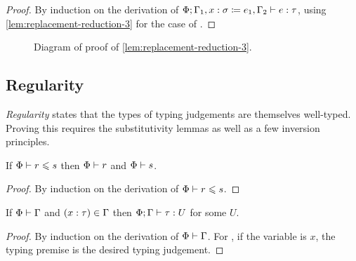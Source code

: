 \begin{proof}
By induction on the derivation of
$\Phi; \Gamma_1, x \mathrel{:} \sigma \mathrel{\coloneqq} e_1, \Gamma_2 \mathrel{\vdash} e \mathrel{:} \tau$,
using \cref{lem:replacement-reduction-3}
for the case of .
\end{proof}

\begin{figure}[h]
\centering
{}
\caption{Diagram of proof of \cref{lem:replacement-reduction-3}.}
\label{fig:replacement-reduction-3}
\end{figure}

\subsection{Regularity}

\emph{Regularity}
states that the types of typing judgements are themselves well-typed.
Proving this requires the substitutivity lemmas as well as a few inversion principles.

\begin{lemma} \label{lem:wf-subsize}
If $\Phi \mathrel{\vdash} r \mathrel{\leqslant} s$ then $\Phi \mathrel{\vdash} r$ and $\Phi \mathrel{\vdash} s$.
\end{lemma}

\begin{proof}
By induction on the derivation of $\Phi \mathrel{\vdash} r \mathrel{\leqslant} s$.
\end{proof}

\begin{lemma} \label{lem:typed-env}
If $\Phi \mathrel{\vdash} \Gamma$ and $(x \mathrel{:} \tau) \in \Gamma$
then $\Phi; \Gamma \mathrel{\vdash} \tau \mathrel{:} U$ for some $U$.
\end{lemma}
\begin{proof}
By induction on the derivation of $\Phi \mathrel{\vdash} \Gamma$.
For , if the variable is $x$, the typing premise is the desired typing judgement.
\end{proof}

